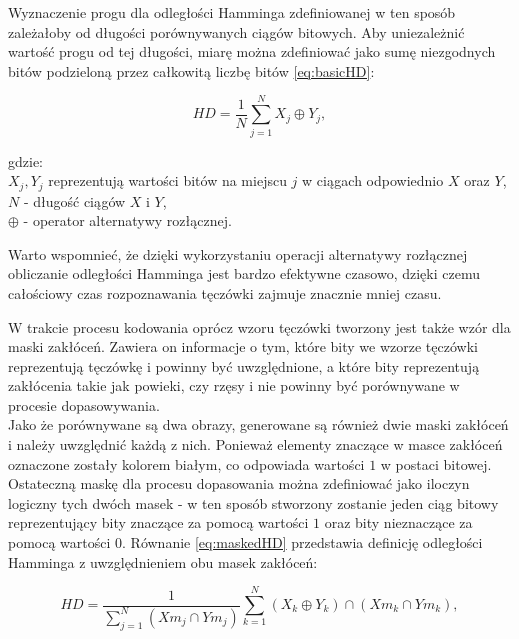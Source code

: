 Wyznaczenie progu dla odległości Hamminga zdefiniowanej w ten sposób zależałoby od długości
porównywanych ciągów bitowych. Aby uniezależni\'c wartoś\'c progu od tej długości, miarę można
zdefiniowa\'c jako sumę niezgodnych bitów podzieloną przez całkowitą liczbę bitów \ref{eq:basicHD}:

\begin{equation}
  \mathit{HD} = \frac{1}{N}\sum\limits_{j=1}^{N}X_{j} \oplus Y_{j},
  \label{eq:basicHD}
\end{equation}

\noindent
gdzie:\\
\indent $X_{j}, Y_{j}$ reprezentują wartości bitów na miejscu $j$ w ciągach odpowiednio $X$ oraz $Y$,\\
\indent $N$ - długoś\'c ciągów $X$ i $Y$,\\
\indent $\oplus$ - operator alternatywy rozłącznej.\newline

Warto wspomnie\'c, że dzięki wykorzystaniu operacji alternatywy rozłącznej obliczanie odległości
Hamminga jest bardzo efektywne czasowo, dzięki czemu całościowy czas rozpoznawania tęczówki zajmuje
znacznie mniej czasu.

W trakcie procesu kodowania oprócz wzoru tęczówki tworzony jest także wzór dla maski zakłóceń.
Zawiera on informacje o tym, które bity we wzorze tęczówki reprezentują tęczówkę i powinny by\'c
uwzględnione, a które bity reprezentują zakłócenia takie jak powieki, czy rzęsy i nie powinny by\'c
porównywane w procesie dopasowywania.\\
Jako że porównywane są dwa obrazy, generowane są również dwie maski zakłóceń i należy uwzględni\'c
każdą z nich. Ponieważ elementy znaczące w masce zakłóceń oznaczone zostały kolorem białym, co odpowiada
wartości $1$ w postaci bitowej. Ostateczną maskę dla procesu dopasowania można zdefiniowa\'c jako
iloczyn logiczny tych dwóch masek - w ten sposób stworzony zostanie jeden ciąg bitowy reprezentujący
bity znaczące za pomocą wartości $1$ oraz bity nieznaczące za pomocą wartości $0$.
Równanie \ref{eq:maskedHD} przedstawia definicję odległości Hamminga z uwzględnieniem obu masek zakłóceń:

\begin{equation}
  \mathit{HD} = \frac{1}{\sum\limits_{j=1}^{N} \left( \mathit{Xm}_{j} \cap \mathit{Ym}_{j} \right) }
       \sum\limits_{k=1}^{N} \left(X_{k} \oplus Y_{k} \right) \cap \left( \mathit{Xm}_{k} \cap \mathit{Ym}_{k} \right),
  \label{eq:maskedHD}
\end{equation}

